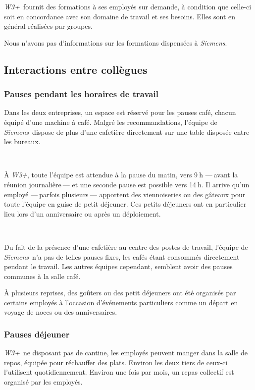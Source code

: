 \documentclass[a4paper, oneside, 12pt]{article}
\def\www{\emph{W3+}}
\def\siemens{\emph{Siemens}}
\begin{document}
\www\ fournit des formations à ses employés sur demande, à condition que celle-ci soit en concordance avec son domaine de travail et ses besoins. Elles sont en général réalisées par groupes.

Nous n’avons pas d’informations sur les formations dispensées à \siemens.

\vfill

\subsection{Interactions entre collègues}

\subsubsection{Pauses pendant les horaires de travail}

Dans les deux entreprises, un espace est réservé pour les pauses café, chacun équipé d’une machine à café. Malgré les recommandations, l’équipe de \siemens\ dispose de plus d’une cafetière directement sur une table disposée entre les bureaux.

\ 

À \www, toute l’équipe est attendue à la pause du matin, vers 9$~$h —$~$avant la réunion journalière$~$— et une seconde pause est possible vers 14$~$h. Il arrive qu’un employé —$~$parfois plusieurs$~$— apportent des viennoiseries ou des gâteaux pour toute l’équipe en guise de petit déjeuner. Ces petits déjeuners ont en particulier lieu lors d’un anniversaire ou après un déploiement.

\ 

Du fait de la présence d’une cafetière au centre des postes de travail, l’équipe de \siemens\ n’a pas de telles pauses fixes, les cafés étant consommés directement pendant le travail. Les autres équipes cependant, semblent avoir des pauses communes à la salle café.

À plusieurs reprises, des goûters ou des petit déjeuners ont été organisés par certains employés à l’occasion d’événements particuliers comme un départ en voyage de noces ou des anniversaires.

\vfill

\newpage

\subsubsection{Pauses déjeuner}

\www\ ne disposant pas de cantine, les employés peuvent manger dans la salle de repos, équipée pour réchauffer des plats. Environ les deux tiers de ceux-ci l’utilisent quotidiennement. Environ une fois par mois, un repas collectif est organisé par les employés.
\end{document}
